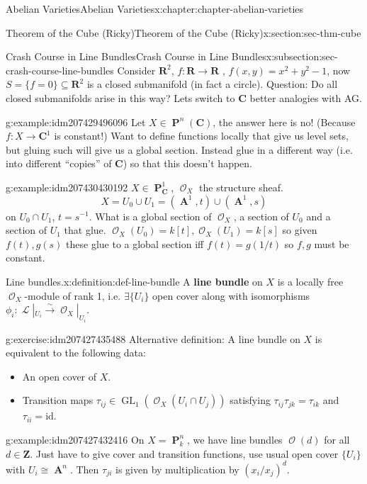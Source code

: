 \documentclass[oneside,10pt,]{book}
\newcommand{\terminology}[1]{\textbf{#1}}
\numberwithin{equation}{section}
\newcommand{\sheaf}[1]{\operatorname{\mathcal{#1}}}
\newcommand{\ZZ}{\mathbf{Z}}
\newcommand{\RR}{\mathbf{R}}
\newcommand{\CC}{\mathbf{C}}
\newcommand{\id}{\mathrm{id}}
\DeclareMathOperator{\aff}{\mathbf{A}}
\DeclareMathOperator{\PP}{\mathbf{P}}
\DeclareMathOperator{\GL}{GL}
\begin{document}
\begin{chapterptx}{Abelian Varieties}{}{Abelian Varieties}{}{}{x:chapter:chapter-abelian-varieties}
\begin{sectionptx}{Theorem of the Cube (Ricky)}{}{Theorem of the Cube (Ricky)}{}{}{x:section:sec-thm-cube}
\begin{subsectionptx}{Crash Course in Line Bundles}{}{Crash Course in Line Bundles}{}{}{x:subsection:sec-crash-course-line-bundles}
Consider \(\RR^2\), \(f\colon \RR \to \RR\) , \(f(x,y) = x^2 + y^2 -1\), now \(S = \{f=0\}\subseteq \RR^2\) is a closed submanifold (in fact a circle). Question: Do all closed submanifolds arise in this way? Lets switch to \(\CC\) better analogies with AG.%
\begin{example}{}{g:example:idm207429496096}%
Let \(X\in \PP^n(\CC)\), the answer here is no! (Because \(f\colon X \to \CC^1\) is constant!) Want to define functions locally that give us level sets, but gluing such will give us a global section. Instead glue in a different way (i.e. into different ``copies'' of \(\CC\)) so that this doesn't happen.%
\end{example}
\begin{example}{}{g:example:idm207430430192}%
\(X\in \PP_\CC^1\), \(\sheaf O_X\) the structure sheaf.%
\begin{equation*}
X = U_0 \cup U_1 = (\aff^1,t) \cup(\aff^1,s)
\end{equation*}
on \(U_0\cap U_1\), \(t = s^{-1}\). What is a global section of \(\sheaf O_X\), a section of \(U_0\) and a section of \(U_1\) that glue. \(\sheaf O_X(U_0) =  k[t], \sheaf O_X(U_1) =  k[s]\) so given \(f(t), g(s)\) these glue to a global section iff \(f(t) = g(1/t)\) so \(f,g\) must be constant.%
\end{example}
\begin{definition}{Line bundles.}{x:definition:def-line-bundle}%
A \terminology{line bundle} on \(X\) is a locally free \(\sheaf O_X\)-module of rank 1, i.e. \(\exists \{U_i\}\) open cover along with isomorphisms \(\phi_i\colon \sheaf L|_{U_i} \xrightarrow\sim \sheaf O_X |_{U_i}\).%
\end{definition}
\begin{inlineexercise}{}{g:exercise:idm207427435488}%
Alternative definition: A line bundle on \(X\) is equivalent to the following data:%
\begin{itemize}[label=\textbullet]
\item{}An open cover of \(X\).%
\item{}Transition maps \(\tau_{ij} \in \GL_1(\sheaf O_X(U_i\cap U_j))\) satisfying \(\tau_{ij}\tau_{jk} =\tau_{ik}\) and \(\tau_{ii} = \id\).%
\end{itemize}
%
\end{inlineexercise}
\begin{example}{}{g:example:idm207427432416}%
On \(X = \PP^n_k\), we have line bundles \(\sheaf O(d)\) for all \(d\in \ZZ\). Just have to give cover and transition functions, use usual open cover \(\{U_i\}\) with \(U_i\cong \aff^n\). Then \(\tau_{ji}\) is given by multiplication by \((x_i/x_j)^d\).%

\end{example}
\end{subsectionptx}
\end{sectionptx}
\end{chapterptx}
\end{document}
